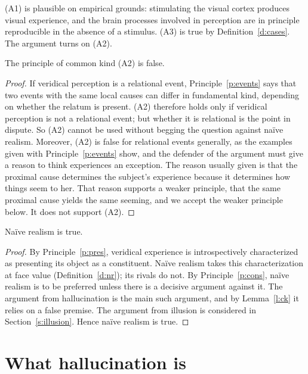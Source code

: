 \documentclass{situationist-preprint}
\begin{document}
(A1) is plausible on empirical grounds: stimulating the visual cortex produces visual experience, and the brain processes involved in perception are in principle reproducible in the absence of a stimulus. (A3) is true by Definition~\ref{d:cases}. The argument turns on (A2).

\begin{lemma}\label{l:ck}
The principle of common kind (A2) is false.
\end{lemma}

\begin{proof}
If veridical perception is a relational event, Principle~\ref{p:events} says that two events with the same local causes can differ in fundamental kind, depending on whether the relatum is present. (A2) therefore holds only if veridical perception is not a relational event; but whether it is relational is the point in dispute. So (A2) cannot be used without begging the question against naïve realism. Moreover, (A2) is false for relational events generally, as the examples given with Principle~\ref{p:events} show, and the defender of the argument must give a reason to think experiences an exception. The reason usually given is that the proximal cause determines the subject's experience because it determines how things seem to her. That reason supports a weaker principle, that the same proximal cause yields the same seeming, and we accept the weaker principle below. It does not support (A2).
\end{proof}

\begin{proposition}\label{p:nr}
Naïve realism is true.
\end{proposition}

\begin{proof}
By Principle~\ref{p:pres}, veridical experience is introspectively characterized as presenting its object as a constituent. Naïve realism takes this characterization at face value (Definition~\ref{d:nr}); its rivals do not. By Principle~\ref{p:cons}, naïve realism is to be preferred unless there is a decisive argument against it. The argument from hallucination is the main such argument, and by Lemma~\ref{l:ck} it relies on a false premise. The argument from illusion is considered in Section~\ref{s:illusion}. Hence naïve realism is true.
\end{proof}

\section{What hallucination is}
\end{document}
